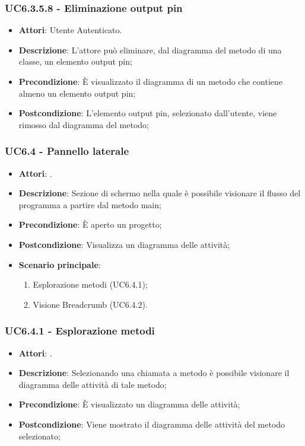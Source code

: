 \subsubsection{UC6.3.5.8 - Eliminazione output pin} 
\label{sssec:UC6.3.5.8} 
\begin{itemize} 
\item \textbf{Attori}: Utente Autenticato.
\item \textbf{Descrizione}: L'attore può eliminare, dal diagramma del metodo di una classe, un elemento output pin;
\item \textbf{Precondizione}: È visualizzato il diagramma di un metodo che contiene almeno un elemento output pin;
\item \textbf{Postcondizione}: L'elemento output pin, selezionato dall'utente, viene rimosso dal diagramma del metodo;
\end{itemize} 
\subsubsection{UC6.4 - Pannello laterale} 
\label{sssec:UC6.4} 
\begin{itemize} 
\item \textbf{Attori}: .
\item \textbf{Descrizione}: Sezione di schermo nella quale è possibile visionare il flusso del programma a partire dal metodo main;
\item \textbf{Precondizione}: È aperto un progetto;
\item \textbf{Postcondizione}: Visualizza un diagramma delle attività;
\item \textbf{Scenario principale}: \begin{enumerate}\item Esplorazione metodi (UC6.4.1);\item Visione Breadcrumb (UC6.4.2). 
 \end{enumerate}
\end{itemize} 
\subsubsection{UC6.4.1 - Esplorazione metodi} 
\label{sssec:UC6.4.1} 
\begin{itemize} 
\item \textbf{Attori}: .
\item \textbf{Descrizione}: Selezionando una chiamata a metodo è possibile visionare il diagramma delle attività di tale metodo;
\item \textbf{Precondizione}: È visualizzato un diagramma delle attività;
\item \textbf{Postcondizione}: Viene mostrato il diagramma delle attività del metodo selezionato;
\end{itemize} 
